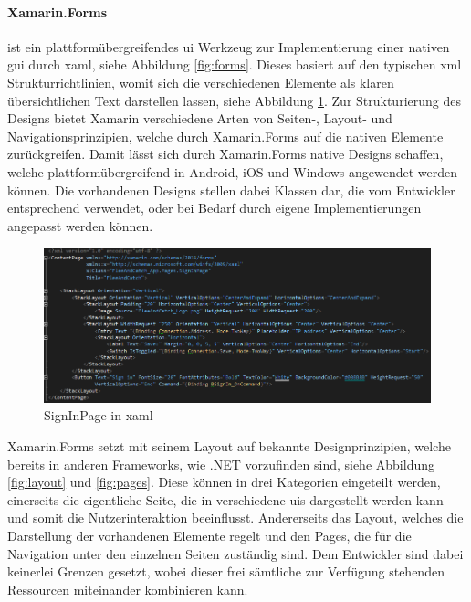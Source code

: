 \paragraph{Xamarin.Forms} ist ein plattformübergreifendes \gls{ui} Werkzeug zur Implementierung einer nativen \gls{gui} durch \gls{xaml}, siehe Abbildung \ref{fig:forms}. Dieses basiert auf den typischen \gls{xml} Strukturrichtlinien, womit sich die verschiedenen Elemente als klaren übersichtlichen Text darstellen lassen, siehe Abbildung \ref{fig:xaml}. Zur Strukturierung des Designs bietet Xamarin verschiedene Arten von Seiten-, Layout- und Navigationsprinzipien, welche durch Xamarin.Forms auf die nativen Elemente zurückgreifen. Damit lässt sich durch Xamarin.Forms native Designs schaffen, welche plattformübergreifend in Android, iOS und Windows angewendet werden können. Die vorhandenen Designs stellen dabei Klassen dar, die vom Entwickler entsprechend verwendet, oder bei Bedarf durch eigene Implementierungen angepasst werden können.\\

\begin{figure}[h]
	\begin{center}
		\includegraphics[width=1\textwidth]{images/technische_grundlagen/xaml.png}
	\end{center}	
	\caption{SignInPage in \acrshort{xaml}}
	\label{fig:xaml}
\end{figure}

\newpage
\noindent
Xamarin.Forms setzt mit seinem Layout auf bekannte Designprinzipien, welche bereits in anderen Frameworks, wie .NET vorzufinden sind, siehe Abbildung \ref{fig:layout} und \ref{fig:pages}. Diese können in drei Kategorien eingeteilt werden, einerseits die eigentliche Seite, die in verschiedene \glspl{ui} dargestellt werden kann und somit die Nutzerinteraktion beeinflusst. Andererseits das Layout, welches die Darstellung der vorhandenen Elemente regelt und den Pages, die für die Navigation unter den einzelnen Seiten zuständig sind. Dem Entwickler sind dabei keinerlei Grenzen gesetzt, wobei dieser frei sämtliche zur Verfügung stehenden Ressourcen miteinander kombinieren kann.

